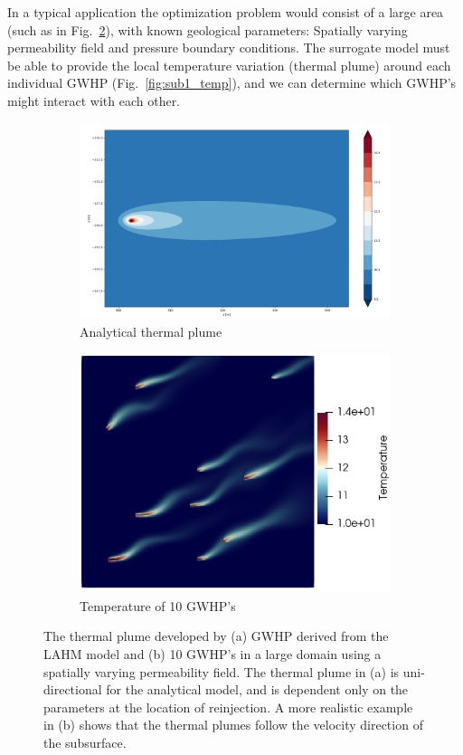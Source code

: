 \documentclass{article} %
\begin{document}
In a typical application the optimization problem would consist of a large area (such as in Fig.~\ref{large_example}), with known geological parameters: Spatially varying permeability field and pressure boundary conditions. 
The surrogate model must be able to provide the local temperature variation (thermal plume) around each individual GWHP (Fig.~\ref{fig:sub1_temp}), and we can determine which GWHP's might interact with each other.

\begin{figure}[!htb]
\centering
\begin{subfigure}{.5\textwidth}
  \centering
  \includegraphics[width=.8\linewidth]{analyticalPlume.png}
  \caption{Analytical thermal plume}
  \label{analyticalPlume}
\end{subfigure}%
\begin{subfigure}{.5\textwidth}
  \centering
  \includegraphics[width=.8\linewidth]{large_temp_example_2.png}
  \caption{Temperature of 10 GWHP's}
  \label{large_example}
\end{subfigure}
\caption{The thermal plume developed by (a) GWHP derived from the LAHM model \citep{Pophillat2020} and (b) 10 GWHP's in a large domain using a spatially varying permeability field. The thermal plume in (a) is uni-directional for the analytical model, and is dependent only on the parameters at the location of reinjection. A more realistic example in (b) shows that the thermal plumes follow the velocity direction of the subsurface.}
\label{fig:plume_and_overview}
\end{figure}
\end{document}
